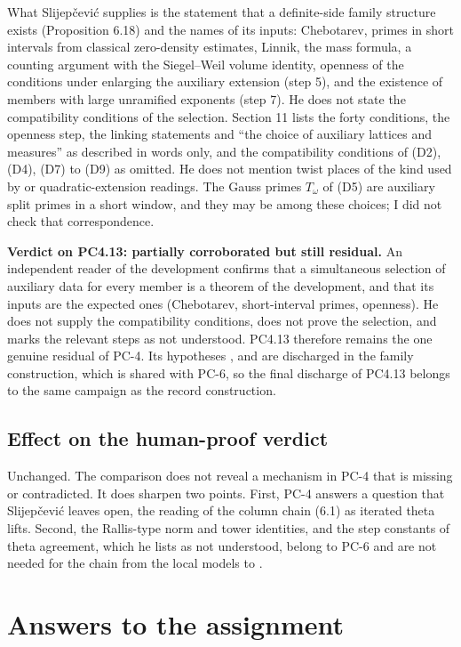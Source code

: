 \documentclass[11pt]{article}
\begin{document}
What Slijepčević supplies is the statement that a definite-side family structure exists (Proposition 6.18) and the names of its inputs: Chebotarev, primes in short intervals from classical zero-density estimates, Linnik, the mass formula, a counting argument with the Siegel--Weil volume identity, openness of the conditions under enlarging the auxiliary extension (step 5), and the existence of members with large unramified exponents (step 7). He does not state the compatibility conditions of the selection. Section 11 lists the forty conditions, the openness step, the linking statements and ``the choice of auxiliary lattices and measures'' as described in words only, and the compatibility conditions of (D2), (D4), (D7) to (D9) as omitted. He does not mention twist places of the kind used by  or quadratic-extension readings. The Gauss primes $T_\omega$ of (D5) are auxiliary split primes in a short window, and they may be among these choices; I did not check that correspondence.

\textbf{Verdict on PC4.13: partially corroborated but still residual.} An independent reader of the development confirms that a simultaneous selection of auxiliary data for every member is a theorem of the development, and that its inputs are the expected ones (Chebotarev, short-interval primes, openness). He does not supply the compatibility conditions, does not prove the selection, and marks the relevant steps as not understood. PC4.13 therefore remains the one genuine residual of PC-4. Its hypotheses ,  and  are discharged in the family construction, which is shared with PC-6, so the final discharge of PC4.13 belongs to the same campaign as the record construction.

\subsection{Effect on the human-proof verdict}

Unchanged. The comparison does not reveal a mechanism in PC-4 that is missing or contradicted. It does sharpen two points. First, PC-4 answers a question that Slijepčević leaves open, the reading of the column chain (6.1) as iterated theta lifts. Second, the Rallis-type norm and tower identities, and the step constants of theta agreement, which he lists as not understood, belong to PC-6 and are not needed for the chain from the local models to .

\section{Answers to the assignment}
\end{document}
